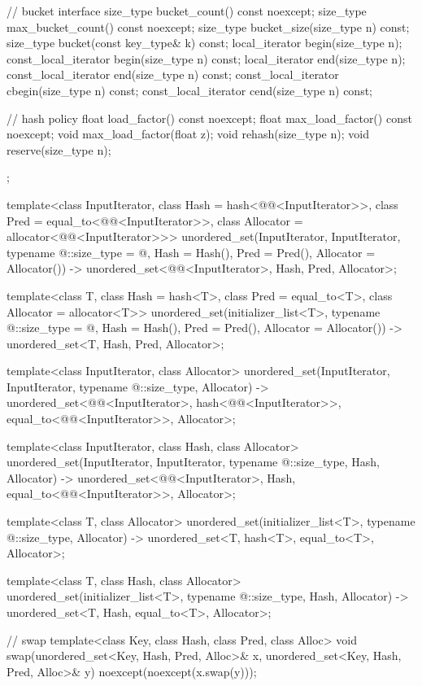 \begin{codeblock}
{{    // bucket interface
    size_type bucket_count() const noexcept;
    size_type max_bucket_count() const noexcept;
    size_type bucket_size(size_type n) const;
    size_type bucket(const key_type& k) const;
    local_iterator begin(size_type n);
    const_local_iterator begin(size_type n) const;
    local_iterator end(size_type n);
    const_local_iterator end(size_type n) const;
    const_local_iterator cbegin(size_type n) const;
    const_local_iterator cend(size_type n) const;

    // hash policy
    float load_factor() const noexcept;
    float max_load_factor() const noexcept;
    void max_load_factor(float z);
    void rehash(size_type n);
    void reserve(size_type n);
  };

  template<class InputIterator,
           class Hash = hash<@@<InputIterator>>,
           class Pred = equal_to<@@<InputIterator>>,
           class Allocator = allocator<@@<InputIterator>>>
    unordered_set(InputIterator, InputIterator, typename @\seebelow@::size_type = @\seebelow@,
                  Hash = Hash(), Pred = Pred(), Allocator = Allocator())
      -> unordered_set<@@<InputIterator>,
                       Hash, Pred, Allocator>;

  template<class T, class Hash = hash<T>,
           class Pred = equal_to<T>, class Allocator = allocator<T>>
    unordered_set(initializer_list<T>, typename @\seebelow@::size_type = @\seebelow@,
                  Hash = Hash(), Pred = Pred(), Allocator = Allocator())
      -> unordered_set<T, Hash, Pred, Allocator>;

  template<class InputIterator, class Allocator>
    unordered_set(InputIterator, InputIterator, typename @\seebelow@::size_type, Allocator)
      -> unordered_set<@@<InputIterator>,
                       hash<@@<InputIterator>>,
                       equal_to<@@<InputIterator>>,
                       Allocator>;

  template<class InputIterator, class Hash, class Allocator>
    unordered_set(InputIterator, InputIterator, typename @\seebelow@::size_type,
                  Hash, Allocator)
      -> unordered_set<@@<InputIterator>, Hash,
                       equal_to<@@<InputIterator>>,
                       Allocator>;

  template<class T, class Allocator>
    unordered_set(initializer_list<T>, typename @\seebelow@::size_type, Allocator)
      -> unordered_set<T, hash<T>, equal_to<T>, Allocator>;

  template<class T, class Hash, class Allocator>
    unordered_set(initializer_list<T>, typename @\seebelow@::size_type, Hash, Allocator)
      -> unordered_set<T, Hash, equal_to<T>, Allocator>;

  // swap
  template<class Key, class Hash, class Pred, class Alloc>
    void swap(unordered_set<Key, Hash, Pred, Alloc>& x,
              unordered_set<Key, Hash, Pred, Alloc>& y)
      noexcept(noexcept(x.swap(y)));
}
\end{codeblock}

